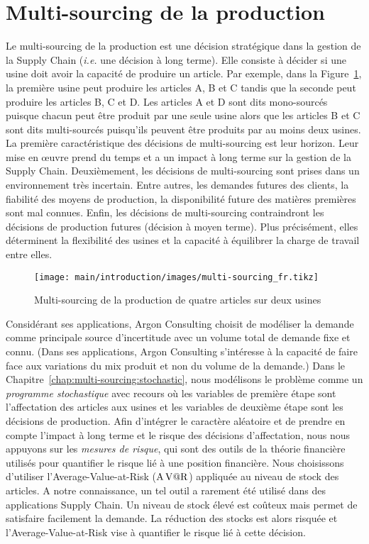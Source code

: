 \section{Multi-sourcing de la production}
\label{sec:intro:fr:multi-sourcing}


Le multi-sourcing de la production est une décision stratégique dans la gestion de la Supply Chain (\emph{i.e.} une décision à long terme).
Elle consiste à décider si une usine doit avoir la capacité de produire un article.
Par exemple, dans la Figure~\ref{fig:intro:fr:multi-sourcing}, la première usine peut produire les articles A, B et C tandis que la seconde peut produire les articles B, C et D.
Les articles A et D sont dits mono-sourcés puisque chacun peut être produit par une seule usine alors que les articles B et C sont dits multi-sourcés puisqu'ils peuvent être produits par au moins deux usines.
La première caractéristique des décisions de multi-sourcing est leur horizon.
Leur mise en \oe{}uvre prend du temps et a un impact à long terme sur la gestion de la Supply Chain.
Deuxièmement, les décisions de multi-sourcing sont prises dans un environnement très incertain.
Entre autres, les demandes futures des clients, la fiabilité des moyens de production, la disponibilité future des matières premières sont mal connues.
Enfin, les décisions de multi-sourcing contraindront les décisions de production futures (décision à moyen terme).
Plus précisément, elles déterminent la flexibilité des usines et la capacité à équilibrer la charge de travail entre elles.


\begin{figure}[!ht]
  \centering
  \texttt{[image: main/introduction/images/multi-sourcing\_fr.tikz]}
  \caption{Multi-sourcing de la production de quatre articles sur deux usines}
  \label{fig:intro:fr:multi-sourcing}
\end{figure}


Considérant ses applications, Argon Consulting choisit de modéliser la demande comme principale source d'incertitude avec un volume total de demande fixe et connu.
(Dans ses applications, Argon Consulting s'intéresse à la capacité de faire face aux variations du mix produit et non du volume de la demande.)
Dans le Chapitre~\ref{chap:multi-sourcing:stochastic}, nous modélisons le problème comme un \emph{programme stochastique} avec recours où les variables de première étape sont l'affectation des articles aux usines et les variables de deuxième étape sont les décisions de production.
Afin d'intégrer le caractère aléatoire et de prendre en compte l'impact à long terme et le risque des décisions d'affectation, nous nous appuyons sur les \emph{mesures de risque}, qui sont des outils de la théorie financière utilisés pour quantifier le risque lié à une position financière.
Nous choisissons d'utiliser l'Average-Value-at-Risk ($\operatorname{A\operatorname{V@R}}$) appliquée au niveau de stock des articles.
A notre connaissance, un tel outil a rarement été utilisé dans des applications Supply Chain.
Un niveau de stock élevé est coûteux mais permet de satisfaire facilement la demande.
La réduction des stocks est alors risquée et l'Average-Value-at-Risk vise à quantifier le risque lié à cette décision.



